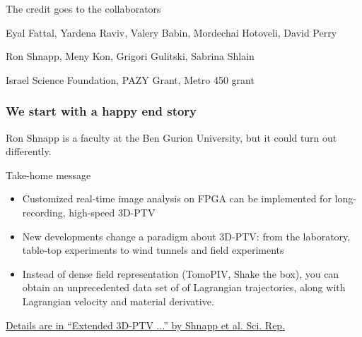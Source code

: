 \documentclass[aspectratio=43]{beamer}
\begin{document}
\begin{frame}[label=credit-1]{The credit goes to the collaborators }
\begin{multicols}{2}
\centering
{} 
\end{multicols}
\end{frame}
%
\begin{frame}[label=credit-2]
\begin{card}
Eyal Fattal, Yardena Raviv, Valery Babin, Mordechai Hotoveli, David Perry
\end{card}
\begin{card}[TAU]
Ron Shnapp, Meny Kon, Grigori Gulitski, Sabrina Shlain
\end{card}
\begin{card}[Funding]
Israel Science Foundation, PAZY Grant, Metro 450 grant
\end{card}
\end{frame}
%

\begin{frame}[label=ron]
\frametitle{We start with a happy end story}
\begin{cardTiny}
Ron Shnapp is a faculty at the Ben Gurion University, but it could turn out differently. 
\end{cardTiny}
\end{frame}

\begin{frame}{Take-home message}
\begin{itemize}
\item Customized real-time image analysis on FPGA can be implemented for long-recording, high-speed 3D-PTV
\item New developments change a paradigm about 3D-PTV: from the laboratory, table-top experiments to wind tunnels and field experiments
\item Instead of dense field representation (TomoPIV, Shake the box),  you can obtain an unprecedented data set of of Lagrangian trajectories, along with Lagrangian velocity and material derivative. 
\end{itemize}

\begin{cardTiny}\href{https://www.nature.com/articles/s41598-019-43555-2}{Details are in ``Extended 3D-PTV ...'' by Shnapp et al. Sci. Rep.}
\end{cardTiny}

\end{frame}
%
\end{document}
